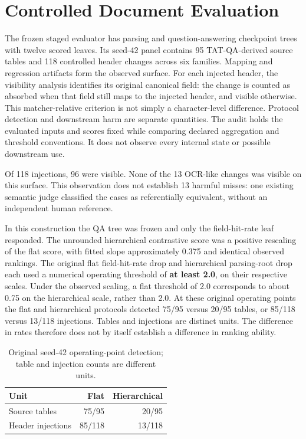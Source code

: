\documentclass[runningheads]{llncs}
\begin{document}
\section{Controlled Document
Evaluation}\label{controlled-document-evaluation}

The frozen staged evaluator has parsing and question-answering
checkpoint trees with twelve scored leaves. Its seed-42 panel contains
95 TAT-QA-derived source tables \cite{r9} and 118 controlled header
changes across six families. Mapping and regression artifacts form the
observed surface. For each injected header, the visibility analysis
identifies its original canonical field: the change is counted as
absorbed when that field still maps to the injected header, and visible
otherwise. This matcher-relative criterion is not simply a
character-level difference. Protocol detection and downstream harm are
separate quantities. The audit holds the evaluated inputs and scores
fixed while comparing declared aggregation and threshold conventions. It
does not observe every internal state or possible downstream use.

Of 118 injections, 96 were visible. None of the 13 OCR-like changes was
visible on this surface. This observation does not establish 13 harmful
misses: one existing semantic judge classified the cases as
referentially equivalent, without an independent human reference.

In this construction the QA tree was frozen and only the field-hit-rate
leaf responded. The unrounded hierarchical contrastive score was a
positive rescaling of the flat score, with fitted slope approximately
0.375 and identical observed rankings. The original flat field-hit-rate
drop and hierarchical parsing-root drop each used a numerical operating
threshold of \textbf{at least 2.0}, on their respective scales. Under
the observed scaling, a flat threshold of 2.0 corresponds to about 0.75
on the hierarchical scale, rather than 2.0. At these original operating
points the flat and hierarchical protocols detected 75/95 versus 20/95
tables, or 85/118 versus 13/118 injections. Tables and injections are
distinct units. The difference in rates therefore does not by itself
establish a difference in ranking ability.

\begin{table}[htbp]
\caption{Original seed-42 operating-point detection; table and injection counts are different units.}
\label{tab:original-detection}
\centering
\begin{tabular}{lrr}
\hline
Unit & Flat & Hierarchical \\
\hline
Source tables & 75/95 & 20/95 \\
Header injections & 85/118 & 13/118 \\
\hline
\end{tabular}
\end{table}
\end{document}
